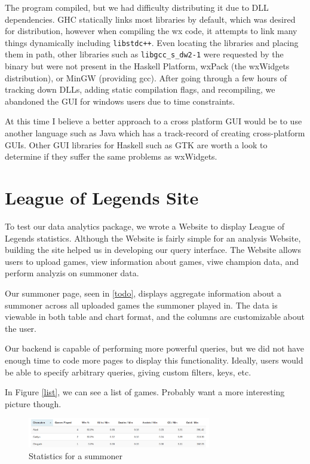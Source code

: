 \documentclass[letterpaper,twocolumn,9pt]{article}
\newcommand{\code}[1]{\texttt{#1}}
\begin{document}
The program compiled, but we had difficulty distributing it due to DLL dependencies.  GHC statically links most libraries by default, which was desired for distribution, however when compiling the wx code, it attempts to link many things dynamically including \code{libstdc++}.  Even locating the libraries and placing them in path, other libraries such as \code{libgcc\_s\_dw2-1} were requested by the binary but were not present in the Haskell Platform, wxPack (the wxWidgets distribution), or MinGW (providing gcc).  After going through a few hours of tracking down DLLs, adding static compilation flags, and recompiling, we abandoned the GUI for windows users due to time constraints.

At this time I believe a better approach to a cross platform GUI would be to use another language such as Java which has a track-record of creating cross-platform GUIs. Other GUI libraries for Haskell such as GTK are worth a look to determine if they suffer the same problems as wxWidgets.

\section{League of Legends Site}
\label{site}

To test our data analytics package, we wrote a Website to display League of Legends statistics. Although the Website is fairly simple for an analysis Website, building the site helped us in developing our query interface. The Website allows users to upload games, view information about games, viwe champion data, and perform analyzis on summoner data.

Our summoner page, seen in \ref{todo}, displays aggregate information about a summoner across all uploaded games the summoner played in. The data is viewable in both table and chart format, and the columns are customizable about the user.

Our backend is capable of performing more powerful queries, but we did not have enough time to code more pages to display this functionality. Ideally, users would be able to specify arbitrary queries, giving custom filters, keys, etc.

In Figure \ref{list}, we can see a list of games. Probably want a more interesting picture though.

\begin{figure}[h]
    \includegraphics[width=80mm]{imgs/stats.png}
    \caption{Statistics for a summoner}
    \label{chart}
\end{figure}
\end{document}

